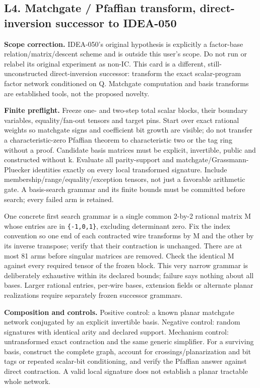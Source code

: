 \documentclass[
  10pt,
]{article}
\begin{document}
\subsection{L4. Matchgate / Pfaffian transform, direct-inversion
successor to
IDEA-050}\label{l4.-matchgate-pfaffian-transform-direct-inversion-successor-to-idea-050}

\textbf{Scope correction.} IDEA-050's original hypothesis is explicitly
a factor-base relation/matrix/descent scheme and is outside this user's
scope. Do not run or relabel its original experiment as non-IC. This
card is a different, still-unconstructed direct-inversion successor:
transform the exact scalar-program factor network conditioned on Q.
Matchgate computation and basis transforms are established tools, not
the proposed novelty.

\textbf{Finite preflight.} Freeze one- and two-step total scalar blocks,
their boundary variables, equality/fan-out tensors and target pins.
Start over exact rational weights so matchgate signs and coefficient bit
growth are visible; do not transfer a characteristic-zero Pfaffian
theorem to characteristic two or the tag ring without a proof. Candidate
basis matrices must be explicit, invertible, public and constructed
without k. Evaluate all parity-support and matchgate/Grassmann-Pluecker
identities exactly on every local transformed signature. Include
membership/range/equality/exception tensors, not just a favorable
arithmetic gate. A basis-search grammar and its finite bounds must be
committed before search; every failed arm is retained.

One concrete first search grammar is a single common 2-by-2 rational
matrix M whose entries are in \texttt{\{-1,0,1\}}, excluding determinant
zero. Fix the index convention so one end of each contracted wire
transforms by M and the other by its inverse transpose; verify that
their contraction is unchanged. There are at most 81 arms before
singular matrices are removed. Check the identical M against every
required tensor of the frozen block. This very narrow grammar is
deliberately exhaustive within its declared bounds; failure says nothing
about all bases. Larger rational entries, per-wire bases, extension
fields or alternate planar realizations require separately frozen
successor grammars.

\textbf{Composition and controls.} Positive control: a known planar
matchgate network conjugated by an explicit invertible basis. Negative
control: random signatures with identical arity and declared support.
Mechanism control: untransformed exact contraction and the same generic
simplifier. For a surviving basis, construct the complete graph, account
for crossings/planarization and bit tags or repeated scalar-bit
conditioning, and verify the Pfaffian answer against direct contraction.
A valid local signature does not establish a planar tractable whole
network.
\end{document}
